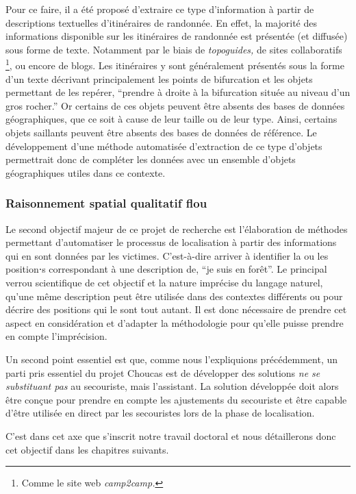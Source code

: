 Pour ce faire, il a été proposé d'extraire ce type d'information à
partir de descriptions textuelles d'itinéraires de randonnée. En
effet, la majorité des informations disponible sur les itinéraires de
randonnée est présentée (et diffusée) sous forme de texte. Notamment
par le biais de \emph{topoguides,} de sites collaboratifs
\footnote{Comme le site web \emph{camp2camp.}}, ou encore de
blogs. Les itinéraires y sont généralement présentés sous la forme
d'un texte décrivant principalement les points de bifurcation et les
objets permettant de les repérer, \eg \enquote{prendre à droite à la
  bifurcation située au niveau d'un gros rocher.} Or certains de ces
objets peuvent être absents des bases de données géographiques, que ce
soit à cause de leur taille ou de leur type. Ainsi, certains objets
saillants peuvent être absents des bases de données de référence. Le
développement d'une méthode automatisée d'extraction de ce type
d'objets permettrait donc de compléter les données avec un ensemble
d'objets géographiques utiles dans ce contexte.

\subsubsection{Raisonnement spatial qualitatif flou}
\label{subsec:1-2-3-2}

Le second objectif majeur de ce projet de recherche est l’élaboration
de méthodes permettant d'automatiser le processus de localisation à
partir des informations qui en sont données par les
victimes. C'est-à-dire arriver à identifier la ou les position⋅s
correspondant à une description de, \eg \enquote{je suis en forêt}. Le
principal verrou scientifique de cet objectif et la nature imprécise
du langage naturel, \ie qu'une même description peut être utilisée
dans des contextes différents ou pour décrire des positions qui le
sont tout autant. Il est donc nécessaire de prendre cet aspect en
considération et d'adapter la méthodologie pour qu'elle puisse prendre
en compte l'imprécision.

Un second point essentiel est que, comme nous l'expliquions
précédemment, un parti pris essentiel du projet Choucas est de
développer des solutions \emph{ne se substituant pas} au secouriste,
mais l’assistant. La solution développée doit alors être conçue pour
prendre en compte les ajustements du secouriste et être capable d'être
utilisée en direct par les secouristes lors de la phase de
localisation.

C'est dans cet axe que s'inscrit notre travail doctoral et nous
détaillerons donc cet objectif dans les chapitres suivants.

